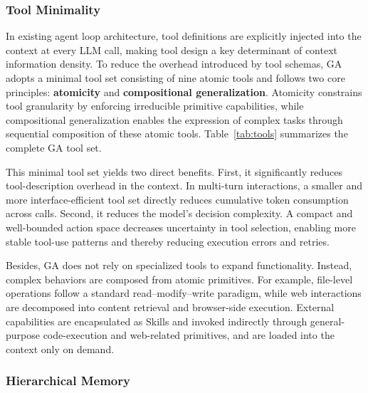 \subsubsection{Tool Minimality}
In existing agent loop architecture, tool definitions are explicitly injected into the context at every LLM call, making tool design a key determinant of context information density. To reduce the overhead introduced by tool schemas, GA adopts a minimal tool set consisting of nine atomic tools and follows two core principles: \textbf{atomicity} and \textbf{compositional generalization}. Atomicity constrains tool granularity by enforcing irreducible primitive capabilities, while compositional generalization enables the expression of complex tasks through sequential composition of these atomic tools. Table~\ref{tab:tools} summarizes the complete GA tool set.

This minimal tool set yields two direct benefits. First, it significantly reduces tool-description overhead in the context. In multi-turn interactions, a smaller and more interface-efficient tool set directly reduces cumulative token consumption across calls. Second, it reduces the model’s decision complexity. A compact and well-bounded action space decreases uncertainty in tool selection, enabling more stable tool-use patterns and thereby reducing execution errors and retries.

Besides, GA does not rely on specialized tools to expand functionality. Instead, complex behaviors are composed from atomic primitives. For example, file-level operations follow a standard read–modify–write paradigm, while web interactions are decomposed into content retrieval and browser-side execution. External capabilities are encapsulated as Skills and invoked indirectly through general-purpose code-execution and web-related primitives, and are loaded into the context only on demand. 

\subsubsection{Hierarchical Memory}

